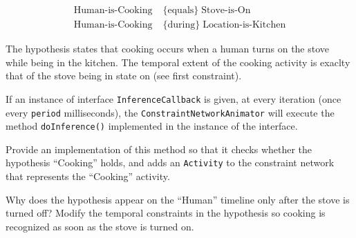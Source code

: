 \documentclass[a4paper]{article}
\begin{document}
\begin{align}
\text{Human-is-Cooking} &\;\{\text{equals}\}\; \text{Stove-is-On}\nonumber\\
\text{Human-is-Cooking} &\;\{\text{during}\}\; \text{Location-is-Kitchen}\nonumber
\end{align} 

The hypothesis states that cooking occurs when a human turns on the stove while being in the kitchen.  The temporal extent of the cooking activity is exaclty that of the stove being in state on (see first constraint).

If an instance of interface {\tt InferenceCallback} is given, at every iteration (once every {\tt period} milliseconds), the {\tt ConstraintNetworkAnimator} will execute the method {\tt doInference()} implemented in the instance of the interface.

{\ex{}\label{ex:ex10}
Provide an implementation of this method so that it checks whether the hypothesis ``Cooking'' holds, and adds an {\tt Activity} to the constraint network that represents the ``Cooking'' activity.
\vspace{0.1cm}}

{\ex{}\label{ex:ex11}
Why does the hypothesis appear on the ``Human'' timeline only after the stove is turned off? Modify the temporal constraints in the hypothesis so cooking is recognized as soon as the stove is turned on.
\vspace{0.1cm}}

%
%
\end{document}
